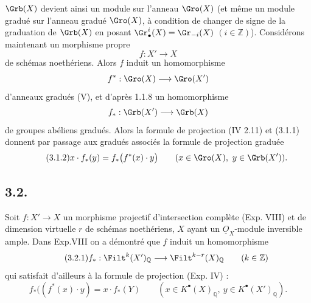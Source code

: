 
\(\Grb(X)\)
devient ainsi un module sur l'anneau \(\Gro(X)\) (et même un module gradué sur l'anneau gradué \(\Gro(X)\), à condition de changer de signe de la graduation de \(\Grb(X)\) en posant \(\Gr^i_\bullet(X)=\Gr_{-i}(X)\) \((i\in\mathbb Z)\)).
Considérons maintenant un morphisme propre
\[
 f:X'\longrightarrow X
\]
de schémas noethériens. Alors \(f\) induit un homomorphisme
\[
 f^*:\Gro(X)\longrightarrow\Gro(X')
\]
d'anneaux gradués (V), et d'après 1.1.8 un homomorphisme
\[
 f_*:\Grb(X')\longrightarrow\Grb(X)
\]
de groupes abéliens gradués. Alors la formule de projection (IV 2.11) et (3.1.1) donnent par passage aux gradués associés la formule de projection graduée
\begin{equation}\tag{3.1.2}
 x\cdot f_*(y)=f_*\bigl(f^*(x)\cdot y\bigr)
 \qquad (x\in\Gro(X),\ y\in\Grb(X')).
\end{equation}

\subsection*{3.2.}
Soit \(f:X'\to X\) un morphisme projectif d'intersection complète (Exp. VIII) et de dimension virtuelle \(r\) de schémas noethériens, \(X\) ayant un \(\underline{O}_X\)-module inversible ample. Dans Exp.VIII on a démontré que \(f\) induit un homomorphisme
\begin{equation}\tag{3.2.1}
 f_*:\Filt^k(X')_{\mathbb Q}\longrightarrow\Filt^{k-r}(X)_{\mathbb Q}\qquad(k\in\mathbb Z)
\end{equation}
qui satisfait d'ailleurs à la formule de projection (Exp. IV) :
\begin{equation}\tag{3.2.2}
 f_*((f^*(x)\cdot y)=x\cdot f_*(Y)
 \qquad (x\in K^{\bullet}(X)_{\mathbb Q},\ y\in K^{\bullet}(X')_{\mathbb Q}).
\end{equation}
